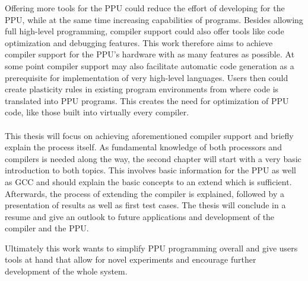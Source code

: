 Offering more tools for the \ac{PPU} could reduce the effort of developing for the \ac{PPU}, while at the same time increasing capabilities of programs.
Besides allowing full high-level programming, compiler support could also offer tools like code optimization and debugging features.
This work therefore aims to achieve compiler support for the \ac{PPU}'s hardware with as many features as possible.
At some point compiler support may also facilitate automatic code generation as a prerequisite for implementation of very high-level languages.
Users then could create plasticity rules in existing program environments from where code is translated into \ac{PPU} programs.
This creates the need for optimization of \ac{PPU} code, like those built into virtually every compiler.
\\
\\
This thesis will focus on achieving aforementioned compiler support and briefly explain the process itself.
As fundamental knowledge of both processors and compilers is needed along the way, the second chapter will start with a very basic introduction to both topics.
This involves basic information for the \ac{PPU} as well as \ac{GCC} and should explain the basic concepts to an extend which is sufficient.
Afterwards, the process of extending the compiler is explained, followed by a presentation of results as well as first test cases.
The thesis will conclude in a resume and give an outlook to future applications and development of the compiler and the \ac{PPU}.

Ultimately this work wants to simplify \ac{PPU} programming overall and give users tools at hand that allow for novel experiments and encourage further development of the whole system.




